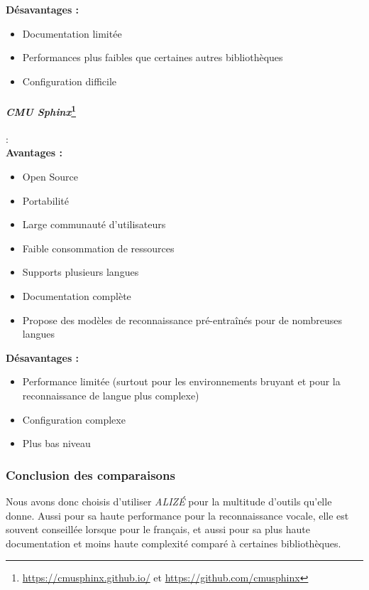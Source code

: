 \textbf{Désavantages :}
\begin{itemize}
    \item Documentation limitée
    \item Performances plus faibles que certaines autres bibliothèques
    \item Configuration difficile
\end{itemize}

\paragraph*{\textbf{\textit{CMU Sphinx}}\footnote{\url{https://cmusphinx.github.io/} et \url{https://github.com/cmusphinx}}}: \\

\textbf{Avantages :}
\begin{itemize}
    \item Open Source
    \item Portabilité
    \item Large communauté d'utilisateurs
    \item Faible consommation de ressources
    \item Supports plusieurs langues
    \item Documentation complète
    \item Propose des modèles de reconnaissance pré-entraînés pour de nombreuses langues
\end{itemize}

\textbf{Désavantages :}
\begin{itemize}
    \item Performance limitée (surtout pour les environnements bruyant et pour la reconnaissance de langue plus complexe)
    \item Configuration complexe
    \item Plus bas niveau
\end{itemize}



\subsubsection*{Conclusion des comparaisons}

Nous avons donc choisis d'utiliser \textit{ALIZÉ} pour la multitude d'outils qu'elle donne. Aussi pour sa haute performance pour la reconnaissance vocale,
elle est souvent conseillée lorsque pour le français, et aussi pour sa plus haute documentation et moins haute complexité comparé à certaines bibliothèques.

